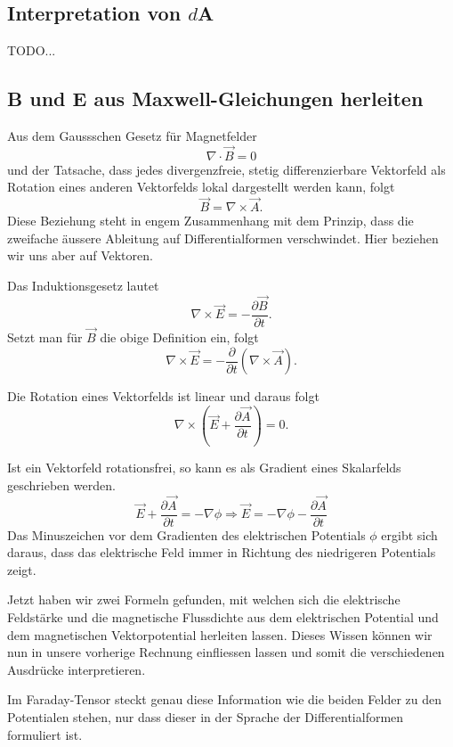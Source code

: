 \subsection{Interpretation von $d$A}
TODO...

\subsection{B und E aus Maxwell-Gleichungen herleiten}
Aus dem Gaussschen Gesetz für Magnetfelder
\begin{equation}
	\nabla \cdot \vec{B} = 0
\end{equation}
und der Tatsache, dass jedes divergenzfreie, stetig differenzierbare Vektorfeld als Rotation eines anderen Vektorfelds lokal dargestellt werden kann,
folgt
\begin{equation}
	\vec{B} = \nabla \times \vec{A}.
\end{equation}
Diese Beziehung steht in engem Zusammenhang mit dem Prinzip, dass die zweifache äussere Ableitung auf Differentialformen verschwindet. Hier beziehen wir uns aber auf Vektoren.

Das Induktionsgesetz lautet
\begin{equation}
	\nabla \times \vec{E} = - \frac{\partial \vec{B}}{\partial t}.
\end{equation}
Setzt man für $\vec{B}$ die obige Definition ein, folgt
\begin{equation}
	\nabla \times \vec{E} = - \frac{\partial}{\partial t}(\nabla \times \vec{A}).
\end{equation}

Die Rotation eines Vektorfelds ist linear und daraus folgt
\begin{equation}
	\nabla \times \left( \vec{E} + \frac{\partial \vec{A}}{\partial t}\right) = 0.
\end{equation}

Ist ein Vektorfeld rotationsfrei, so kann es als Gradient eines Skalarfelds geschrieben werden.
\begin{equation}
	\vec{E} + \frac{\partial \vec{A}}{\partial t} = -\nabla \phi \Rightarrow \vec{E} = -\nabla \phi -\frac{\partial \vec{A}}{\partial t}
\end{equation}
Das Minuszeichen vor dem Gradienten des elektrischen Potentials $\phi$ ergibt sich daraus, dass das elektrische Feld immer in Richtung des niedrigeren Potentials zeigt.

Jetzt haben wir zwei Formeln gefunden, mit welchen sich die elektrische Feldstärke und die magnetische Flussdichte aus dem elektrischen Potential und dem magnetischen Vektorpotential herleiten lassen. Dieses Wissen können wir nun in unsere vorherige Rechnung einfliessen lassen und somit die verschiedenen Ausdrücke interpretieren.

Im Faraday-Tensor steckt genau diese Information wie die beiden Felder zu den Potentialen stehen, nur dass dieser in der Sprache der Differentialformen formuliert ist.


